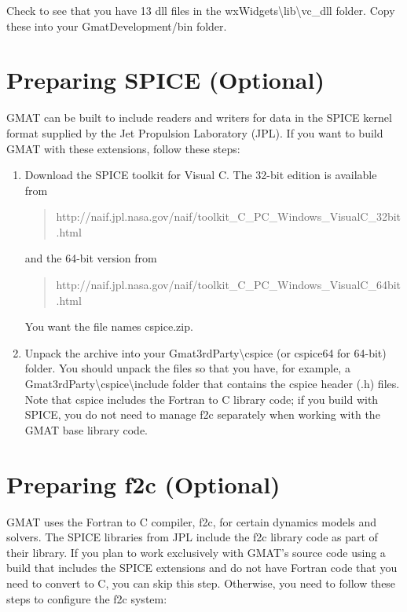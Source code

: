 \documentclass[letterpaper,10pt]{article}%
\begin{document}
\noindent Check to see that you have 13 dll files in the wxWidgets\textbackslash lib\textbackslash vc\_dll folder.  Copy these into your GmatDevelopment/bin folder.

\section{Preparing SPICE (Optional)}

GMAT can be built to include readers and writers for data in the SPICE kernel format supplied by the Jet Propulsion Laboratory (JPL).  If you want to build GMAT with these extensions, follow these steps:

\begin{enumerate}
\item Download the SPICE toolkit for Visual C.  The 32-bit edition is available from
\begin{quote}
http://naif.jpl.nasa.gov/naif/toolkit\_C\_PC\_Windows\_VisualC\_32bit.html
\end{quote}
\noindent and the 64-bit version from
\begin{quote}
http://naif.jpl.nasa.gov/naif/toolkit\_C\_PC\_Windows\_VisualC\_64bit.html
\end{quote}
\noindent You want the file names cspice.zip.
\item Unpack the archive into your Gmat3rdParty\textbackslash cspice (or cspice64 for 64-bit) folder.  You should unpack the files so that you have, for example, a Gmat3rdParty\textbackslash cspice\textbackslash include folder that contains the cspice header (.h) files.  Note that cspice includes the Fortran to C library code; if you build with SPICE, you do not need to manage f2c separately when working with the GMAT base library code.
\end{enumerate}

\section{Preparing f2c (Optional)}

GMAT uses the Fortran to C compiler, f2c, for certain dynamics models and solvers.  The SPICE libraries from JPL include the f2c library code as part of their library.  If you plan to work exclusively with GMAT's source code using a build that includes the SPICE extensions and do not have Fortran code that you need to convert to C, you can skip this step.  Otherwise, you need to follow these steps to configure the f2c system:
\end{document}

